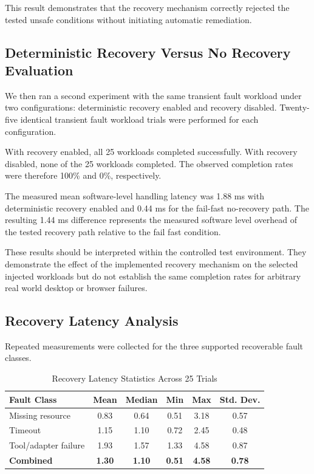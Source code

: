 \documentclass[conference]{IEEEtran}
\begin{document}
This result demonstrates that the recovery mechanism correctly rejected the tested unsafe conditions without initiating automatic remediation.

\subsection{Deterministic Recovery Versus No Recovery Evaluation}
We then ran a second experiment with the same transient fault workload under two configurations: deterministic recovery enabled and recovery disabled. Twenty-five identical transient fault workload trials were performed for each configuration.

With recovery enabled, all 25 workloads completed successfully. With recovery disabled, none of the 25 workloads completed. The observed completion rates were therefore 100\% and 0\%, respectively.

The measured mean software-level handling latency was 1.88 ms with deterministic recovery enabled and 0.44 ms for the fail-fast no-recovery path. The resulting 1.44 ms difference represents the measured software level overhead of the tested recovery path relative to the fail fast condition.

These results should be interpreted within the controlled test environment. They demonstrate the effect of the implemented recovery mechanism on the selected injected workloads but do not establish the same completion rates for arbitrary real world desktop or browser failures.

\subsection{Recovery Latency Analysis}
Repeated measurements were collected for the three supported recoverable fault classes.

\begin{table}[htbp]
\caption{Recovery Latency Statistics Across 25 Trials}
\label{tab:latency_stats}
\centering
\begin{tabular}{p{2.8cm} c c c c c}
\toprule
\textbf{Fault Class} & \textbf{Mean} & \textbf{Median} & \textbf{Min} & \textbf{Max} & \textbf{Std. Dev.} \\
\midrule
Missing resource & 0.83 & 0.64 & 0.51 & 3.18 & 0.57 \\
Timeout & 1.15 & 1.10 & 0.72 & 2.45 & 0.48 \\
Tool/adapter failure & 1.93 & 1.57 & 1.33 & 4.58 & 0.87 \\
\midrule
\textbf{Combined} & \textbf{1.30} & \textbf{1.10} & \textbf{0.51} & \textbf{4.58} & \textbf{0.78} \\
\bottomrule
\end{tabular}
\end{table}
\end{document}
